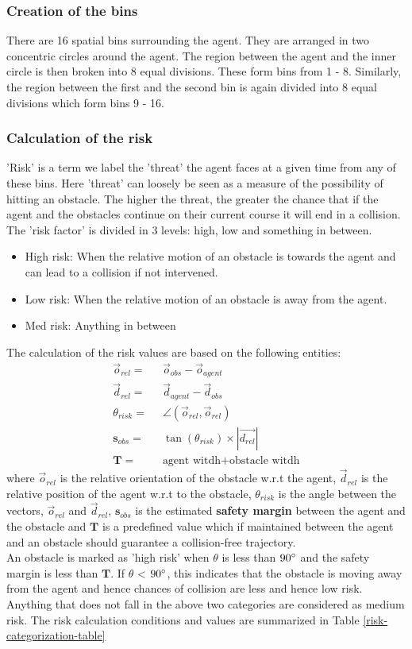 \subsubsection*{Creation of the bins}
There are 16 spatial bins surrounding the agent. They are arranged in two concentric circles around the agent. The region between the agent and the inner circle is then broken into 8 equal divisions. These form bins from 1 - 8. Similarly, the region between the first and the second bin is again divided into 8 equal divisions which form bins 9 - 16.
\subsubsection*{Calculation of the risk}
'Risk' is a term we label the 'threat' the agent faces at a given time from any of these bins. Here 'threat' can loosely be seen as a measure of the possibility of hitting an obstacle. The higher the threat, the greater the chance that if the agent and the obstacles continue on their current course it will end in a collision.
The 'risk factor' is divided in 3 levels: high, low and something in between.
\begin{itemize}
	\item High risk:
When the relative motion of an obstacle is towards the agent and can lead to a collision if not intervened.
	\item Low risk:
When the relative motion of an obstacle is away from the agent.
	\item Med risk:
Anything in between
\end{itemize}
The calculation of the risk values are based on the following entities:
\begin{align}
	\vec{o}_{rel} = & \;\; \vec{o}_{obs} - \vec{o}_{agent}  \\
	\vec{d}_{rel} =  &\;\; \vec{d}_{agent} - \vec{d}_{obs} \\
	\theta_{risk} =  & \;\; \angle (\vec{o}_{rel}, \vec{o}_{rel}) \\
	\mathbf{s}_{obs} = & \;\; \tan(\theta_{risk}) \times |\vec{d_{rel}}| \\
	\mathbf{T} = & \;\; \text{agent witdh} + \text{obstacle witdh}
\end{align}
where $\vec{o}_{rel}$ is the relative orientation of the obstacle w.r.t the agent, $\vec{d}_{rel}$ is the relative position of the agent w.r.t to the obstacle, $\theta_{risk}$ is the angle between the vectors, $\vec{o}_{rel}$ and $\vec{d}_{rel}$,  $\mathbf{s}_{obs}$ is the estimated \textbf{safety margin} between the agent and the obstacle and $\mathbf{T}$ is a predefined value which if maintained between the agent and an obstacle should guarantee a collision-free trajectory.\\
An obstacle is marked as 'high risk' when $\theta$ is less than $90\degree$ and the safety margin is less than $\mathbf{T}$. If $\theta$ < $90 \degree$, this indicates that the obstacle is moving away from the agent and hence chances of collision are less and hence low risk. Anything that does not fall in the above two categories are considered as medium risk. The risk calculation conditions and values are summarized in Table \ref{risk-categorization-table}

